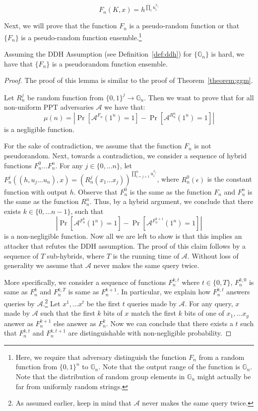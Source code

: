 \documentclass[12pt]{tufte-book}
\begin{document}
\[F_n(K,x) = h^{\prod_{i} u_i^{x_i}}\]

Next, we will prove that the function $F_n$ is a pseudo-random function or that $\{F_n\}$ is a pseudo-random function ensemble.\footnote{Here, we require that adversary distinguish the function $F_n$ from a random function from $\{0,1\}^n$ to $\mathbb{G}_n$. Note that the output range of the function is $\mathbb{G}_n$. Note that the distribution of random group elements in $\mathbb{G}_n$ might actually be far from uniformly random strings.}
\begin{lemma}
Assuming the DDH Assumption (see Definition~\ref{def:ddh}) for $\{\mathbb{G}_n\}$ is hard, we have that $\{F_n\}$ is a pseudorandom function ensemble.
\end{lemma}
\begin{proof}
The proof of this lemma is similar to the proof of Theorem~\ref{theorem:ggm}.

Let $R_n^j$ be random function from $\{0,1\}^j \rightarrow \mathbb{G}_n$. Then we want to prove that for all non-uniform PPT adversaries $\mathcal{A}$ we have that:
\[\mu(n) = \left|\Pr[\mathcal{A}^{F_n}(1^n) =1] -  \Pr[\mathcal{A}^{R_n^n}(1^n) =1]\right|\]
is a negligible function. 

For the sake of contradiction, we assume that the function $F_n$ is not pseudorandom. Next, towards a contradiction, we consider a sequence of hybrid functions $F_n^0 \ldots F_n^n$. 
For any $j \in \{0,\ldots n\}$, let $F^j_n((h,u_{j}\ldots u_n),x) = (R_n^j(x_1\ldots x_j))^{\prod_{i=j+1}^n u_i^{x_i}}$, where $R_n^0(\epsilon)$ is the constant function with output $h$. Observe that $F_n^0$ is the same as the function $F_n$ and $F_n^n$ is the same as the function $R_n^n$. Thus, by a hybrid argument, we conclude that there exists $k \in \{0,\ldots n-1\}$, such that 
\[\left|\Pr[\mathcal{A}^{F_n^k}(1^n) =1] -  \Pr[\mathcal{A}^{F_n^{k+1}}(1^n) =1]\right|\]
is a non-negligible function. Now all we are left to show is that this implies an attacker that refutes the DDH assumption. The proof of this claim follows by a sequence of $T$ sub-hybrids, where $T$ is the running time of $\mathcal{A}$. Without loss of generality we assume that $\mathcal{A}$ never makes the same query twice. 

More specifically, we consider a sequence of functions $F_n^{k,t}$ where $t \in \{0,T\}$, $F_n^{k,0}$ is same as $F_n^{k}$ and $F_n^{k,T}$ is same as $F_n^{k+1}$. In particular, we explain how $F_n^{k,t}$ answers queries by $\mathcal{A}$.\footnote{As assumed earlier, keep in mind that $\mathcal{A}$ never makes the same query twice.} Let $x^1, \ldots x^t$ be the first $t$ queries made by $\mathcal{A}$. For any query, $x$ made by $\mathcal{A}$ such that the first $k$ bits of $x$ match the first $k$ bits of one of $x_1, \ldots x_y$ answer as $F_n^{k+1}$ else answer as $F_n^{k}$. Now we can conclude that there exists a $t$ such that $F_n^{k,t}$ and $F_n^{k,t+1}$ are distinguishable with non-negligible probability. 


\end{proof}
\end{document}
